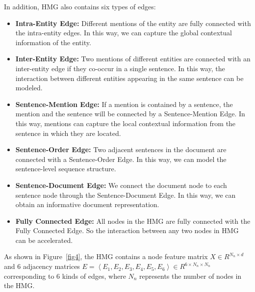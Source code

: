 \documentclass[sigconf,natbib=true]{acmart}
\begin{document}
In addition, HMG also contains six types of edges:
\begin{itemize}
    \item \textbf{Intra-Entity Edge:} Different mentions of the entity are fully connected with the intra-entity edges. In this way, we can capture the global contextual information of the entity. %
    \item \textbf{Inter-Entity Edge:} Two mentions of different entities are connected with an inter-entity edge if they co-occur in a single sentence. In this way, the interaction between different entities appearing in the same sentence can be modeled.
    \item \textbf{Sentence-Mention Edge:} If a mention is contained by a sentence, the mention and the sentence will be connected by a Sentence-Mention Edge. In this way, mentions can capture the local contextual information from the sentence in which they are located.
    \item \textbf{Sentence-Order Edge:} Two adjacent sentences in the document are connected with a Sentence-Order Edge. In this way, we can model the sentence-level sequence structure.
    \item \textbf{Sentence-Document Edge:} We connect the document node to each sentence node through the Sentence-Document Edge. In this way, we can obtain an informative document representation.
    \item \textbf{Fully Connected Edge:} All nodes in the HMG are fully connected with the Fully Connected Edge. So the interaction between any two nodes in HMG can be accelerated.
\end{itemize}
As shown in Figure~\ref{fig4}, the HMG contains a node feature matrix $X\in R^{N_n \times d}$ and 6 adjacency matrices $E=\left \langle E_1,E_2,E_3,E_4,E_5,E_6 \right \rangle \in R^{6 \times N_n \times N_n}$  corresponding to 6 kinds of edges, where $N_n$ represents the number of nodes in the HMG.


\end{document}
